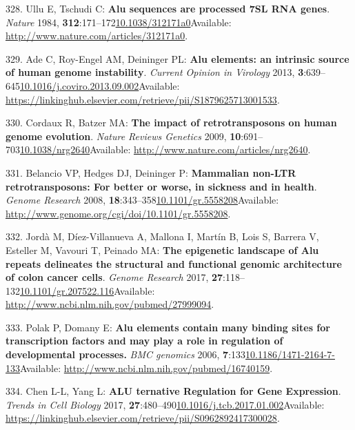 \documentclass[
]{book}
\begin{document}
\leavevmode\hypertarget{ref-Ullu1984}{}%
328. Ullu E, Tschudi C: \textbf{Alu sequences are processed 7SL RNA genes}. \emph{Nature} 1984, \textbf{312}:171--172\href{https://doi.org/10.1038/312171a0}{10.1038/312171a0}Available: \url{http://www.nature.com/articles/312171a0}.

\leavevmode\hypertarget{ref-Ade2013}{}%
329. Ade C, Roy-Engel AM, Deininger PL: \textbf{Alu elements: an intrinsic source of human genome instability}. \emph{Current Opinion in Virology} 2013, \textbf{3}:639--645\href{https://doi.org/10.1016/j.coviro.2013.09.002}{10.1016/j.coviro.2013.09.002}Available: \url{https://linkinghub.elsevier.com/retrieve/pii/S1879625713001533}.

\leavevmode\hypertarget{ref-Cordaux2009}{}%
330. Cordaux R, Batzer MA: \textbf{The impact of retrotransposons on human genome evolution}. \emph{Nature Reviews Genetics} 2009, \textbf{10}:691--703\href{https://doi.org/10.1038/nrg2640}{10.1038/nrg2640}Available: \url{http://www.nature.com/articles/nrg2640}.

\leavevmode\hypertarget{ref-Belancio2008}{}%
331. Belancio VP, Hedges DJ, Deininger P: \textbf{Mammalian non-LTR retrotransposons: For better or worse, in sickness and in health}. \emph{Genome Research} 2008, \textbf{18}:343--358\href{https://doi.org/10.1101/gr.5558208}{10.1101/gr.5558208}Available: \url{http://www.genome.org/cgi/doi/10.1101/gr.5558208}.

\leavevmode\hypertarget{ref-Jorda2017}{}%
332. Jordà M, Díez-Villanueva A, Mallona I, Martín B, Lois S, Barrera V, Esteller M, Vavouri T, Peinado MA: \textbf{The epigenetic landscape of Alu repeats delineates the structural and functional genomic architecture of colon cancer cells}. \emph{Genome Research} 2017, \textbf{27}:118--132\href{https://doi.org/10.1101/gr.207522.116}{10.1101/gr.207522.116}Available: \url{http://www.ncbi.nlm.nih.gov/pubmed/27999094}.

\leavevmode\hypertarget{ref-Polak2006}{}%
333. Polak P, Domany E: \textbf{Alu elements contain many binding sites for transcription factors and may play a role in regulation of developmental processes.} \emph{BMC genomics} 2006, \textbf{7}:133\href{https://doi.org/10.1186/1471-2164-7-133}{10.1186/1471-2164-7-133}Available: \url{http://www.ncbi.nlm.nih.gov/pubmed/16740159}.

\leavevmode\hypertarget{ref-Chen2017b}{}%
334. Chen L-L, Yang L: \textbf{ALU ternative Regulation for Gene Expression}. \emph{Trends in Cell Biology} 2017, \textbf{27}:480--490\href{https://doi.org/10.1016/j.tcb.2017.01.002}{10.1016/j.tcb.2017.01.002}Available: \url{https://linkinghub.elsevier.com/retrieve/pii/S0962892417300028}.
\end{document}

